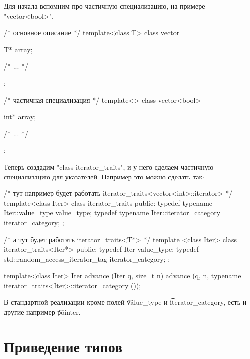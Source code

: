 Для начала вспомним про частичную специализацию, на примере \cpp"vector<bool>".
\begin{cppcode}
/* основное описание */
template<class T>
class vector {
    T* array;

    /* ... */
};

/* частичная специализация */
template<>
class vector<bool> {
    int* array;

    /* ... */
};
\end{cppcode}



Теперь создадим \cpp"class iterator_traits", и у него сделаем частичную специализацию для указателей.
Например это можно сделать так:
\begin{cppcode}
/* тут например будет работать iterator_traits<vector<int>::iterator> */
template<class Iter>
class iterator_traits {
public:
    typedef typename Iter::value_type value_type;
    typedef typename Iter::iterator_category iterator_category;
};

/* а тут будет работать iterator_traits<T*> */
template <class Iter> 
class iterator_traits<Iter*> {
public:
    typedef Iter value_type;
    typedef std::random_access_iterator_tag iterator_category;
};

template<class Iter>
Iter advance (Iter q, size_t n) {
    advance (q, n, typename iterator_traits<Iter>::iterator_category ());
}
\end{cppcode}
В стандартной реализации кроме полей \t{value\_type} и \t{iterator\_category}, есть и другие например \t{pointer}.

\section{Приведение типов}

